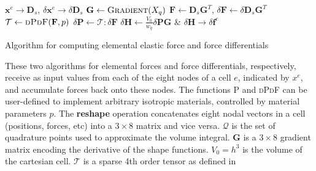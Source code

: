 {\begin{algorithm}[p]
  \begin{minipage}{1\textwidth}
      \setlength{\baselineskip}{1.35em}
      \begin{algorithmic}[1]
        \State \Reshape $\mathbf x^e \rightarrow \mathbf{D}_s$,
        $\delta{} \mathbf x^e \rightarrow \delta{} \mathbf{D}_s$
        \State \Compute $\mathbf G \leftarrow \Call{Gradient}{X_q}$
        \State \Compute $\mathbf{F} \leftarrow
          \mathbf{D}_s\mathbf{G}^T$, $\delta{} \mathbf{F} \leftarrow
        \delta{} \mathbf{D}_s\mathbf{G}^T$
        \State \Compute $\mathcal{T} \leftarrow
          \Call{dPdF}{\mathbf F, p}$
        \State \Compute $\delta\mathbf{P} \leftarrow \mathcal T :
        \delta \mathbf F$
        \State \Accum $\delta{}\mathbf{H} \leftarrow
        \frac{V_0}{w_q}\delta{}\mathbf{PG}$
        \EndFor
        \State \Reshape \& \Accum $\delta{}\mathbf{H} \rightarrow
        \delta{}\mathbf f^e$
        \EndProcedure
      \end{algorithmic}
    \end{minipage}
    \vspace{.15in}
  \caption{Algorithm for computing elemental elastic force and force
    differentials}{These two algorithms for elemental forces and force
    differentials, respectively, receive as input values from each of
    the eight nodes of a cell $e$, indicated by $x^e$, and accumulate
    forces back onto these nodes. The functions \textsc{P} and \textsc{dPdF}
    can be user-defined to implement arbitrary isotropic
    materials, controlled by material parameters $p$. The
    \textbf{reshape} operation concatenates eight nodal vectors in a
    cell (positions, forces, etc) into a $3\times 8$
    matrix and vice versa. $\mathcal Q$ is the set of quadrature points
    used to approximate the volume integral. $\mathbf{G}$ is a
    $3\times 8$ gradient matrix encoding the derivative of the shape
    functions. $V_0=h^3$ is the volume of the
    cartesian cell. $\mathcal{T}$ is a sparse 4th order tensor as
    defined in \protect\cite{TeranSIF:2005} }
  \label{alg:isotropicforces}
\end{algorithm}
\clearpage
}

